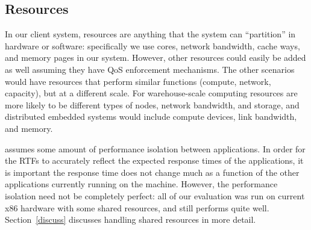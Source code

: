 
\subsection*{Resources}
In our client system, resources are anything that the system can ``partition'' in hardware or software: specifically we use cores, network bandwidth, cache ways, and memory pages in our system.  However, other resources could easily be added as well assuming they have QoS enforcement mechanisms.  The other scenarios would have resources that perform similar functions (compute, network, capacity), but at a different scale. For warehouse-scale computing resources are more likely to be different types of nodes, network bandwidth, and storage, and distributed embedded systems would include compute devices, link bandwidth, and memory.

\pacora assumes some amount of performance isolation between applications.  In order for the RTFs to accurately reflect the expected response times of the applications, it is important the response time does not change much as a function of the other applications currently running on the machine.   However, the performance isolation need not be completely perfect: all of our evaluation was run on current x86 hardware with some shared resources, and \pacora still performs quite well. Section~\ref{discuss} discusses handling shared resources in more detail.


